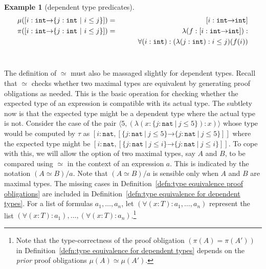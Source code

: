 \documentclass [12pt,twoside]{cslreport}
\newcommand{\thmbox}
   {{\ \hfill\hbox{%
      \vrule width1.0ex height1.0ex
   }\parfillskip 0pt }}
\newtheorem{example}[thm]{Example}
\newcommand{\aro}{\mathord\rightarrow} %
\newcommand{\pair}[1]{\langle #1 \rangle}
\newcommand{\funtype}[2]{[#1 \aro #2]}
\newcommand{\tupletype}[1]{[#1]}
\newcommand{\ttint}{\mathtt{int}}
\newcommand{\ttnat}{\mathtt{nat}}
\newcommand{\vbar}{\ |\ }
\newenvironment{Eg}[1]{\begin{example}[#1]\label{eg:#1}\em }{\thmbox\end{example}}
\begin{document}
\newcommand{\depfunexample}{\funtype{i : \ttint}{\{j : \ttint \vbar i\leq
j\}}}
\newcommand{\deptupexample}{\tupletype{i : \ttnat, \{j: nat \vbar j\leq i\}}}
\begin{Eg}{dependent type predicates}
\begin{eqnarray*}
\mu(\depfunexample{}) & = & \funtype{i : \ttint}{\ttint}\\
\pi(\depfunexample{}) & = & \lambda (f : \funtype{i : \ttint}{\ttint}):\\&&\hspace{.3in}
\forall (i: \ttint): (\lambda (j : \ttint): i\leq j)(f(i))
\end{eqnarray*}
\end{Eg}

The definition of $\simeq$ must also be massaged slightly for dependent
types.  Recall that $\simeq$ checks whether two maximal types are
equivalent by generating proof obligations as needed.  This is the
basic operation for checking whether the expected type of an expression
is compatible with its actual type.  
The subtlety now is that the expected type might be
a dependent type where the actual type is not.  Consider the
case of the pair $\pair{5, (\lambda (x : \{j:\ttnat \vbar j\leq 5\}): x)}$
whose type would be computed 
by $\tau$ as $\tupletype{i : \ttnat, \funtype{\{j : \ttnat\vbar j\leq 5\}}{\{j : \ttnat\vbar j\leq 5\}}}$
where the expected type might be 
$\tupletype{i : \ttnat, \funtype{\{j : \ttnat \vbar j\leq i\}}{\{j : \ttnat \vbar
j\leq i\}}}$\@.  To cope with this, 
we will allow the option of two maximal types, say $A$ and $B$, to be
compared using $\simeq$
in the context of an expression $a$\@.  This is indicated by the notation $(A\simeq B)/a$\@.  
Note that $(A\simeq B)/a$ is sensible only when $A$ and $B$
are maximal types.   The missing cases in
Definition~\ref{defn:type equivalence proof obligations}
are included in
Definition~\ref{defn:type equivalence for dependent types}.    For a list
of formulas $a_1, \ldots, a_n$, let 
$(\forall (x : T): a_1,\ldots, a_n)$ represent the list
$(\forall (x : T): a_1), \ldots, (\forall (x : T): a_n)$\@.\footnote{Note that the type-correctness of the proof
obligation $(\pi(A) = \pi(A'))$ in
Definition~\ref{defn:type equivalence for dependent types}  depends on the
\emph{prior} proof obligations 
$\mu(A)\simeq \mu(A')$.}
\end{document}
